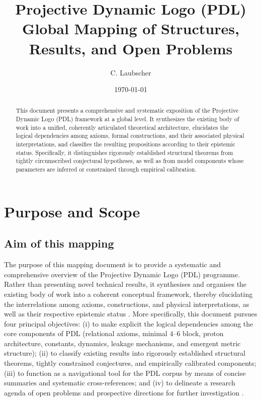 \documentclass{article}
\title{Projective Dynamic Logo (PDL)\\
Global Mapping of Structures, Results, and Open Problems}
\author{C. Laubscher}
\date{\today}
\begin{document}
\setcounter{tocdepth}{1}

\maketitle

\begin{abstract}
This document presents a comprehensive and systematic exposition of the Projective Dynamic Logo (PDL) framework at a global level. It synthesizes the existing body of work into a unified, coherently articulated theoretical architecture, elucidates the logical dependencies among axioms, formal constructions, and their associated physical interpretations, and classifies the resulting propositions according to their epistemic status. Specifically, it distinguishes rigorously established structural theorems from tightly circumscribed conjectural hypotheses, as well as from model components whose parameters are inferred or constrained through empirical calibration.
\end{abstract}
\tableofcontents

\section{Purpose and Scope}
\label{sec:purpose_scope}

\subsection{Aim of this mapping}
\label{subsec:aim}

The purpose of this mapping document is to provide a systematic and comprehensive overview of the Projective Dynamic Logo (PDL) programme. Rather than presenting novel technical results, it synthesises and organises the existing body of work into a coherent conceptual framework, thereby elucidating the interrelations among axioms, constructions, and physical interpretations, as well as their respective epistemic status \citep{PDL_position,PDL_intro}. More specifically, this document pursues four principal objectives: (i) to make explicit the logical dependencies among the core components of PDL (relational axioms, minimal $4$--$6$ block, proton architecture, constants, dynamics, leakage mechanisms, and emergent metric structure); (ii) to classify existing results into rigorously established structural theorems, tightly constrained conjectures, and empirically calibrated components; (iii) to function as a navigational tool for the PDL corpus by means of concise summaries and systematic cross-references; and (iv) to delineate a research agenda of open problems and prospective directions for further investigation \citep{PDL_position}.
\end{document}
